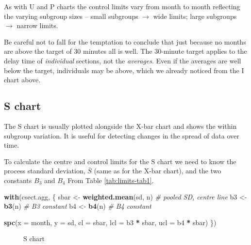 \documentclass[
]{book}
\makeatletter
\newenvironment{Shaded}{\begin{snugshade}}{\end{snugshade}}
\newcommand{\AttributeTok}[1]{\textcolor[rgb]{0.13,0.29,0.53}{#1}}
\newcommand{\CommentTok}[1]{\textcolor[rgb]{0.56,0.35,0.01}{\textit{#1}}}
\newcommand{\FunctionTok}[1]{\textcolor[rgb]{0.13,0.29,0.53}{\textbf{#1}}}
\newcommand{\NormalTok}[1]{#1}
\newcommand{\OtherTok}[1]{\textcolor[rgb]{0.56,0.35,0.01}{#1}}
\newcommand{\SpecialCharTok}[1]{\textcolor[rgb]{0.81,0.36,0.00}{\textbf{#1}}}
\newcommand*\pandocbounded[1]{%
  \sbox\pandoc@box{#1}%
  \Gscale@div\@tempa{\textheight}{\dimexpr\ht\pandoc@box+\dp\pandoc@box\relax}%
  \Gscale@div\@tempb{\linewidth}{\wd\pandoc@box}%
  \ifdim\@tempb\p@<\@tempa\p@\let\@tempa\@tempb\fi%
  \ifdim\@tempa\p@<\p@\scalebox{\@tempa}{\usebox\pandoc@box}%
  \else\usebox{\pandoc@box}%
  \fi%
}
\makeatother
\begin{document}
As with U and P charts the control limits vary from month to month reflecting the varying subgroup sizes -- small subgroups \(\rightarrow\) wide limits; large subgroups \(\rightarrow\) narrow limits.

Be careful not to fall for the temptation to conclude that just because no months are above the target of 30 minutes all is well. The 30-minute target applies to the delay time of \emph{individual} sections, not the \emph{averages}. Even if the averages are well below the target, individuals may be above, which we already noticed from the I chart above.

\subsection{S chart}\label{s-chart}

The S chart is usually plotted alongside the X-bar chart and shows the within subgroup variation. It is useful for detecting changes in the spread of data over time.

To calculate the centre and control limits for the S chart we need to know the process standard deviation, \(\bar{S}\) (same as for the X-bar chart), and the two constants \(B_3\) and \(B_4\) From Table \ref{tab:limits-tab1}.

\begin{Shaded}
\begin{Highlighting}[]
\FunctionTok{with}\NormalTok{(csect.agg, \{}
\NormalTok{  sbar    }\OtherTok{\textless{}{-}} \FunctionTok{weighted.mean}\NormalTok{(sd, n)  }\CommentTok{\# pooled SD, centre line}
\NormalTok{  b3      }\OtherTok{\textless{}{-}} \FunctionTok{b3}\NormalTok{(n)                 }\CommentTok{\# B3 constant}
\NormalTok{  b4      }\OtherTok{\textless{}{-}} \FunctionTok{b4}\NormalTok{(n)                 }\CommentTok{\# B4 constant}
  
  \FunctionTok{spc}\NormalTok{(}\AttributeTok{x   =}\NormalTok{ month,}
      \AttributeTok{y   =}\NormalTok{ sd,}
      \AttributeTok{cl  =}\NormalTok{ sbar,}
      \AttributeTok{lcl =}\NormalTok{ b3 }\SpecialCharTok{*}\NormalTok{ sbar,}
      \AttributeTok{ucl =}\NormalTok{ b4 }\SpecialCharTok{*}\NormalTok{ sbar)}
\NormalTok{\})}
\end{Highlighting}
\end{Shaded}

\begin{figure}
\centering
\pandocbounded{}
\caption{\label{fig:limits-s}S chart}
\end{figure}
\end{document}
